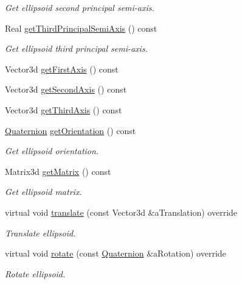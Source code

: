 \begin{DoxyCompactItemize}
\begin{DoxyCompactList}\small\item\em Get ellipsoid second principal semi-\/axis. \end{DoxyCompactList}\item 
Real \hyperlink{classlibrary_1_1math_1_1geom_1_1d3_1_1objects_1_1_ellipsoid_a62b97423985083db726d34eced6b58ae}{get\+Third\+Principal\+Semi\+Axis} () const
\begin{DoxyCompactList}\small\item\em Get ellipsoid third principal semi-\/axis. \end{DoxyCompactList}\item 
Vector3d \hyperlink{classlibrary_1_1math_1_1geom_1_1d3_1_1objects_1_1_ellipsoid_a155ca01528d96ae76bfcbb155c832a20}{get\+First\+Axis} () const
\item 
Vector3d \hyperlink{classlibrary_1_1math_1_1geom_1_1d3_1_1objects_1_1_ellipsoid_a33dde96894c213da77ee116ff18fdf86}{get\+Second\+Axis} () const
\item 
Vector3d \hyperlink{classlibrary_1_1math_1_1geom_1_1d3_1_1objects_1_1_ellipsoid_a12dc0fd72c672b3d78ec9a286db30c70}{get\+Third\+Axis} () const
\item 
\hyperlink{classlibrary_1_1math_1_1geom_1_1trf_1_1rot_1_1_quaternion}{Quaternion} \hyperlink{classlibrary_1_1math_1_1geom_1_1d3_1_1objects_1_1_ellipsoid_a8d426da587827eff577de4edb58ae417}{get\+Orientation} () const
\begin{DoxyCompactList}\small\item\em Get ellipsoid orientation. \end{DoxyCompactList}\item 
Matrix3d \hyperlink{classlibrary_1_1math_1_1geom_1_1d3_1_1objects_1_1_ellipsoid_ae6af9f16762e8c38b0a71c306d29ddbf}{get\+Matrix} () const
\begin{DoxyCompactList}\small\item\em Get ellipsoid matrix. \end{DoxyCompactList}\item 
virtual void \hyperlink{classlibrary_1_1math_1_1geom_1_1d3_1_1objects_1_1_ellipsoid_a7ef605ac9ab20b5bd47ade8603ee6e09}{translate} (const Vector3d \&a\+Translation) override
\begin{DoxyCompactList}\small\item\em Translate ellipsoid. \end{DoxyCompactList}\item 
virtual void \hyperlink{classlibrary_1_1math_1_1geom_1_1d3_1_1objects_1_1_ellipsoid_abe9ead973befc80360179629fc96027a}{rotate} (const \hyperlink{classlibrary_1_1math_1_1geom_1_1trf_1_1rot_1_1_quaternion}{Quaternion} \&a\+Rotation) override
\begin{DoxyCompactList}\small\item\em Rotate ellipsoid. \end{DoxyCompactList}\end{DoxyCompactItemize}
